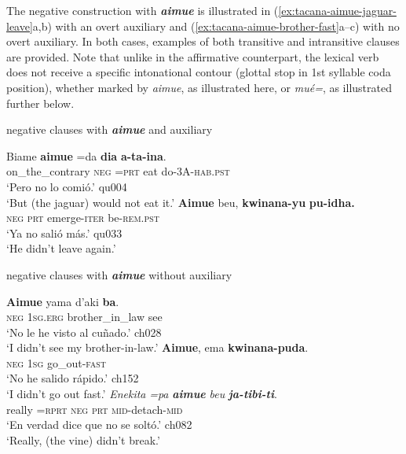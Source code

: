 \documentclass[output=paper,draft,draftmode,colorlinks,citecolor=brown]{langscibook}
\begin{document}
The negative construction with \textbf{\textit{aimue}} is illustrated in
(\ref{ex:tacana-aimue-jaguar-leave}a,b) with an overt auxiliary and
(\ref{ex:tacana-aimue-brother-fast}a--c) with no overt auxiliary. In both cases, examples of both transitive and intransitive clauses are provided. Note that unlike in the affirmative counterpart, the lexical verb does not receive a specific intonational contour (glottal stop in 1st syllable coda position), whether marked by \textit{aimue}, as illustrated here, or \textit{mué=}, as illustrated further below.

\begin{exe}\ex
\label{ex:tacana-aimue-jaguar-leave}  negative clauses with \textbf{\textit{aimue}} and auxiliary
\begin{xlist}
\ex\label{ex:tacana-aimue-jaguar}
\gll  Biame  \textbf{aimue}  =da \textbf{dia}
\textbf{a-ta-ina}.\\
    on\_the\_contrary  \textsc{neg}  \textsc{=prt}  eat
    do\textsc{-3A-hab.pst}\\
\glt `Pero no lo comió.' qu004\\
`But (the jaguar) would not eat it.'
\ex\label{ex:tacana-aimue-leave}
\gll  \textbf{Aimue}  beu, \textbf{kwinana-yu} \textbf{pu-idha.}\\
    \textsc{neg}  \textsc{prt}  emerge-\textsc{iter}  be\textsc{-rem.pst}\\
\glt `Ya no salió más.' qu033\\
`He didn't leave again.'
\end{xlist}
\ex
\label{ex:tacana-aimue-brother-fast}  negative clauses with \textbf{\textit{aimue}} without auxiliary
\begin{xlist}
\ex\label{ex:tacana-aimue-brother}
\gll  \textbf{Aimue} yama d'aki \textbf{ba}.\\
    \textsc{neg}  \textsc{1sg.erg}  brother\_in\_law  see\\
\glt `No le he visto al cuñado.' ch028\\
`I didn't see my brother-in-law.'
\ex\label{ex:tacana-aimue-fast}
\gll  \textbf{Aimue}, ema \textbf{kwinana-puda}.\\
    \textsc{neg}  \textsc{1sg}  go\_out-\textsc{fast}\\
\glt `No he salido rápido.' ch152\\
`I didn't go out fast.'
\ex\label{ex:tacana-aimue-liana}
\gll  \textit{Enekita}  \textit{=pa}  \textbf{\textit{aimue}}
\textit{beu} \textbf{\textit{ja-tibi-ti}}.\\
really  =\textsc{rprt}  \textsc{neg}  \textsc{prt}
\textsc{mid-}detach-\textsc{mid}\\
\glt `En verdad dice que no se soltó.' ch082\\
`Really, (the vine) didn't break.'
\end{xlist}\end{exe}
\end{document}
